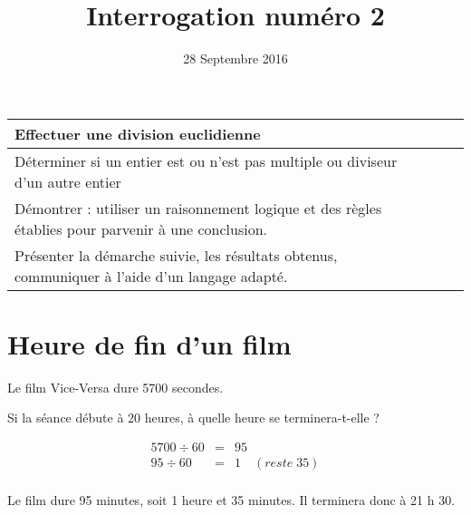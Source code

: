 \documentclass[a4paper,11pt]{exam}
\date{28 Septembre 2016}
\title{Interrogation num\'ero 2}
\begin{document}
	
	\maketitle
\begin{small}
\begin{center}
	\begin{tabular}{|@{\ }l@{}|@{\ }c@{\ }|}
		\hline
		Effectuer une division euclidienne &  \\
		\hline
		Déterminer si un entier est ou n'est pas multiple ou diviseur d'un autre entier &  $\qquad$\\
		\hline
		Démontrer : utiliser un raisonnement logique et des règles établies pour parvenir à une conclusion. &  \\
		\hline
		Présenter la démarche suivie, les résultats obtenus, communiquer à l’aide d’un langage adapté. &  \\
		\hline
	\end{tabular}
\end{center}
\end{small}	
	

\section{Heure de fin d'un film}

Le film Vice-Versa dure \num{5700} secondes. 


\begin{questions}
	\question Si la séance débute à 20 heures, à quelle heure se terminera-t-elle ?
	
	\begin{solution}
		\begin{eqnarray*}
			5700 \div 60 &=& 95  \\
			95 \div 60 &=& 1 \quad (reste\; 35)\\
		\end{eqnarray*}
		
		Le film dure 95 minutes, soit 1 heure et 35 minutes. Il terminera donc à 21 h 30.
	\end{solution}
\end{questions}
	
\end{document}
